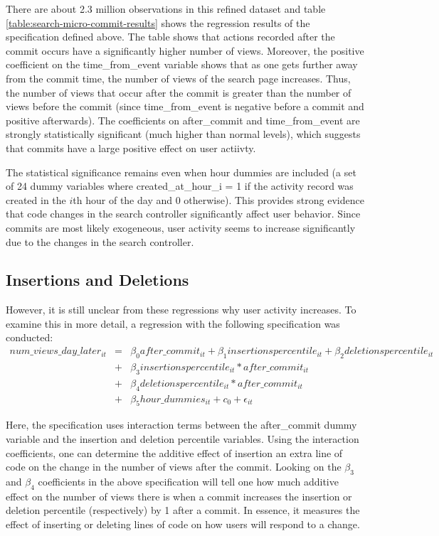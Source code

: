 \documentclass[12pt]{article}
\begin{document}
There are about 2.3 million observations in this refined dataset and table \ref{table:search-micro-commit-results} shows the regression results of the specification defined above. The table shows that actions recorded after the commit occurs have a significantly higher number of views. Moreover, the positive coefficient on the time\_from\_event variable shows that as one gets further away from the commit time, the number of views of the search page increases. Thus, the number of views that occur after the commit is greater than the number of views before the commit (since time\_from\_event is negative before a commit and positive afterwards). The coefficients on after\_commit and time\_from\_event are strongly statistically significant (much higher than normal levels), which suggests that commits have a large positive effect on user actiivty. 

The statistical significance remains even when hour dummies are included (a set of 24 dummy variables where created\_at\_hour\_i = 1 if the activity record was created in the $i$th hour of the day and 0 otherwise). This provides strong evidence that code changes in the search controller significantly affect user behavior. Since commits are most likely exogeneous, user activity seems to increase significantly due to the changes in the search controller. 

\subsection{Insertions and Deletions}

However, it is still unclear from these regressions why user activity increases. To examine this in more detail, a regression with the following specification was conducted:
\begin{eqnarray}
num\_views\_day\_later_{it} &=& \beta_0 after\_commit_{it} + \beta_1 insertionspercentile_{it} + \beta_2 deletionspercentile_{it} \\ \nonumber
&+& \beta_3 insertionspercentile_{it} * after\_commit_{it} \\ \nonumber
&+& \beta_4 deletionspercentile_{it} * after\_commit_{it} \\ \nonumber
&+& \beta_5 hour\_dummies_{it} + c_0 +  \epsilon_{it}
\end{eqnarray}

Here, the specification uses interaction terms between the after\_commit dummy variable and the insertion and deletion percentile variables. Using the interaction coefficients, one can determine the additive effect of insertion an extra line of code on the change in the number of views after the commit. Looking on the $\beta_3$ and $\beta_4$ coefficients in the above specification will tell one how much additive effect on the number of views there is when a commit increases the insertion or deletion percentile (respectively) by 1 after a commit. In essence, it measures the effect of inserting or deleting lines of code on how users will respond to a change.  
\end{document}

